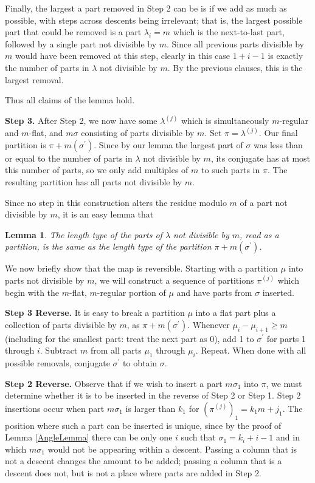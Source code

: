 \documentclass[11pt]{article}
\newtheorem{lemma}[theorem]{Lemma}
\begin{document}
Finally, the largest a part removed in Step 2 can be is if we add as much as possible, with steps across descents being irrelevant; that is, the largest possible part that could be removed is a part $\lambda_i = m$ which is the next-to-last part, followed by a single part not divisible by $m$.  Since all previous parts divisible by $m$ would have been removed at this step, clearly in this case $1+i-1$ is exactly the number of parts in $\lambda$ not divisible by $m$.  By the previous clauses, this is the largest removal.

Thus all claims of the lemma hold.


\textbf{Step 3.} After Step 2, we now have some $\lambda^{(j)}$ which is simultaneously $m$-regular and $m$-flat, and $m\sigma$ consisting of parts divisible by $m$. Set $\pi = \lambda^{(j)}$.  Our final partition is $\pi+m(\sigma^{\prime}).$  Since by our lemma the largest part of $\sigma$ was less than or equal to the number of parts in $\lambda$ not divisible by $m$, its conjugate has at most this number of parts, so we only add multiples of $m$ to such parts in $\pi$.  The resulting partition has all parts not divisible by $m$.

Since no step in this construction alters the residue modulo $m$ of a part not divisible by $m$, it is an easy lemma that

\begin{lemma} The length type of the parts of $\lambda$ not divisible by $m$, read as a partition, is the same as the length type of the partition $\pi + m (\sigma^\prime)$.
\end{lemma}

We now briefly show that the map is reversible.  Starting with a partition $\mu$ into parts not divisible by $m$, we will construct a sequence of partitions $\pi^{(j)}$ which begin with the $m$-flat, $m$-regular portion of $\mu$ and have parts from $\sigma$ inserted.

\textbf{Step 3 Reverse.} It is easy to break a partition $\mu$ into a flat part plus a collection of parts divisible by $m$, as $\pi + m(\sigma^{\prime})$.  Whenever $\mu_i - \mu_{i+1} \geq m$ (including for the smallest part: treat the next part as 0), add 1 to $\sigma^{\prime}$ for parts 1 through $i$.  Subtract $m$ from all parts $\mu_1$ through $\mu_i$.  Repeat.  When done with all possible removals, conjugate $\sigma^{\prime}$ to obtain $\sigma$.

\textbf{Step 2 Reverse.}  Observe that if we wish to insert a part $m\sigma_1$ into $\pi$, we must determine whether it is to be inserted in the reverse of Step 2 or Step 1.  Step 2 insertions occur when part $m\sigma_1$ is larger than $k_1$ for $(\pi^{(j)})_1 = k_1 m + j_1$.  The position where such a part can be inserted is unique, since by the proof of Lemma \ref{AngleLemma} there can be only one $i$ such that $\sigma_1 = k_i + i - 1$ and in which $m \sigma_1$ would not be appearing within a descent.  Passing a column that is not a descent changes the amount to be added; passing a column that is a descent does not, but is not a place where parts are added in Step 2.
\end{document}
